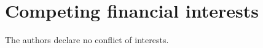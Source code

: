 \documentclass[fleqn,10pt]{wlscirep}
\begin{document}
\section*{Competing financial interests}

The authors declare no conflict of interests.



\newpage




%

%

\end{document}
